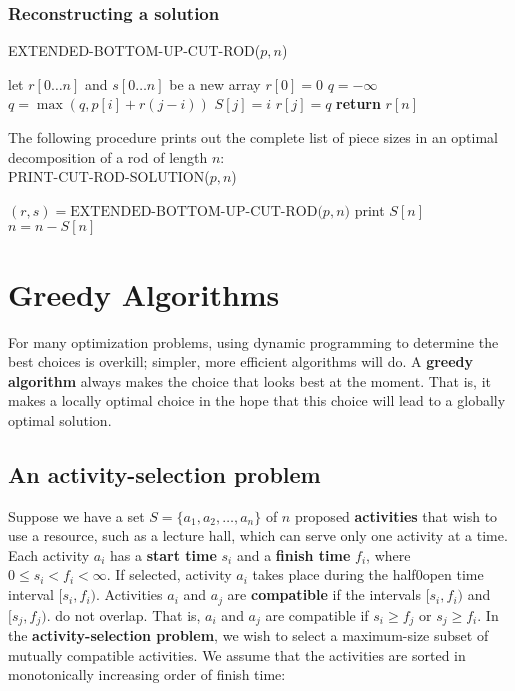 \documentclass[12pt]{article}
\begin{document}
\subsubsection{Reconstructing a solution}

EXTENDED-BOTTOM-UP-CUT-ROD($p, n$)
\begin{algorithmic}[1]
\State let $r[0 \dots n]$ and $s[0 \dots n]$ be a new array
\State $r[0] = 0$
	\State $q = -\infty$
        	\State $q = \max(q, p[i] + r(j-i))$
                \State $S[j] = i$
        \EndFor
        \State $r[j] = q$
\EndFor
\State \textbf{return } $r[n]$
\end{algorithmic}

The following procedure prints out the complete list of piece sizes in an optimal decomposition of a rod of length $n$: \\

PRINT-CUT-ROD-SOLUTION($p, n$)
\begin{algorithmic}[1]
\State $(r,s) = \text{EXTENDED-BOTTOM-UP-CUT-ROD($p, n$)}$
	\State print $S[n]$
        \State $n = n - S[n]$
\EndWhile
\end{algorithmic}

\section{Greedy Algorithms}

For many optimization problems, using dynamic programming to determine the best choices is overkill; simpler, more efficient algorithms will do. A \textbf{greedy algorithm} always makes the choice that looks best at the moment. That is, it makes a locally optimal choice in the hope that this choice will lead to a globally optimal solution.

\subsection{An activity-selection problem}

Suppose we have a set $S = \{ a_1, a_2, \dots, a_n \}$ of $n$ proposed \textbf{activities} that wish to use a resource, such as a lecture hall, which can serve only one activity at a time. Each activity $a_i$ has a \textbf{start time} $s_i$ and a \textbf{finish time} $f_i$, where $0 \le s_i < f_i < \infty$. If selected, activity $a_i$ takes place during the half0open time interval $[s_i, f_i)$. Activities $a_i$ and $a_j$ are \textbf{compatible} if the intervals $[s_i, f_i)$ and $[s_j, f_j)$. do not overlap. That is, $a_i$ and $a_j$ are compatible if $s_i \ge f_j$ or $s_j \ge f_i$. In the \textbf{activity-selection problem}, we wish to select a maximum-size subset of mutually compatible activities. We assume that the activities are sorted in monotonically increasing order of finish time:
\end{document}
